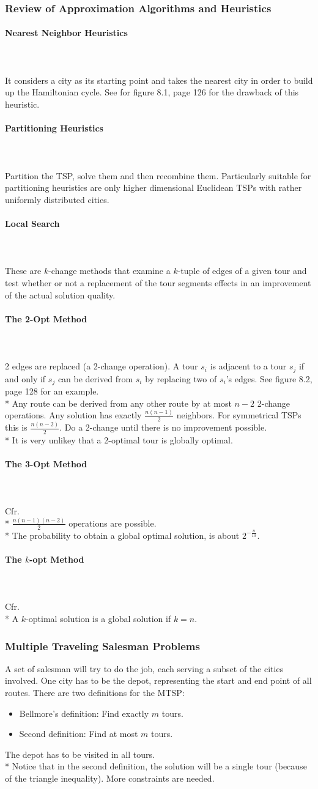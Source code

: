 \documentclass[12pt]{article}
\newcommand{\myparagraph}[1]{\paragraph{#1}\mbox{}\\\\}
\begin{document}
\subsubsection{Review of Approximation Algorithms and Heuristics}
\myparagraph{Nearest Neighbor Heuristics}
It considers a city as its starting point and takes the nearest city in order to build up the Hamiltonian cycle. See for figure 8.1, page 126 for the drawback of this heuristic.
\myparagraph{Partitioning Heuristics}
Partition the TSP, solve them and then recombine them. Particularly suitable for partitioning heuristics are only higher dimensional Euclidean TSPs with rather uniformly distributed cities.
\myparagraph{Local Search}
These are $k$-change methods that examine a $k$-tuple of edges of a given tour and test whether or not a replacement of the tour segments effects in an improvement of the actual solution quality.
\myparagraph{The 2-Opt Method}
2 edges are replaced (a 2-change operation). A tour $s_i$ is adjacent to a tour $s_j$ if and only if $s_j$ can be derived from $s_i$ by replacing two of $s_i$'s edges. See figure 8.2, page 128 for an example.\\*
Any route can be derived from any other route by at most $n-2$ 2-change operations. Any solution has exactly $\frac{n(n-1)}{2}$ neighbors. For symmetrical TSPs this is $\frac{n(n-2)}{2}$. Do a 2-change until there is no improvement possible.\\*
It is very unlikey that a 2-optimal tour is globally optimal.
\myparagraph{The 3-Opt Method}
Cfr.\\*
$\frac{n(n-1)(n-2)}{2}$ operations are possible.\\*
The probability to obtain a global optimal solution, is about $2^{-\frac{n}{10}}$.
\myparagraph{The $k$-opt Method}
Cfr.\\*
A $k$-optimal solution is a global solution if $k = n$.
\subsubsection{Multiple Traveling Salesman Problems}
A set of salesman will try to do the job, each serving a subset of the cities involved. One city has to be the depot, representing the start and end point of all routes. There are two definitions for the MTSP:
\begin{itemize}
\item Bellmore's definition: Find exactly $m$ tours.
\item Second definition: Find at most $m$ tours.
\end{itemize}
The depot has to be visited in all tours.\\*
Notice that in the second definition, the solution will be a single tour (because of the triangle inequality). More constraints are needed.
\end{document}
